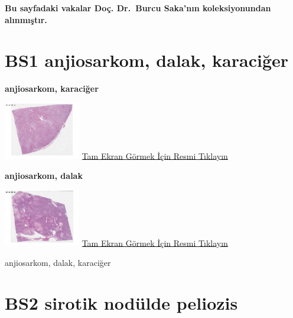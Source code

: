 \documentclass[
  letterpaper,
  DIV=11,
  numbers=noendperiod]{scrreprt}
\begin{document}
\textbf{Bu sayfadaki vakalar Doç. Dr.~Burcu Saka'nın koleksiyonundan
alınmıştır.}

\hypertarget{sec-BS1}{%
\section{BS1 anjiosarkom, dalak, karaciğer}\label{sec-BS1}}

\textbf{anjiosarkom, karaciğer}

\href{https://images.patolojiatlasi.com/BS1/HE1.html}{\includegraphics[width=0.25\textwidth,height=\textheight]{./screenshots/thumbnail_BS1-HE1.png}}
\href{https://images.patolojiatlasi.com/BS1/HE1.html}{Tam Ekran Görmek
İçin Resmi Tıklayın}

\textbf{anjiosarkom, dalak}

\href{https://images.patolojiatlasi.com/BS1/HE2.html}{\includegraphics[width=0.25\textwidth,height=\textheight]{./screenshots/thumbnail_BS1-HE2.png}}
\href{https://images.patolojiatlasi.com/BS1/HE2.html}{Tam Ekran Görmek
İçin Resmi Tıklayın}

\begin{tcolorbox}[enhanced jigsaw, colbacktitle=quarto-callout-tip-color!10!white, colback=white, titlerule=0mm, opacityback=0, colframe=quarto-callout-tip-color-frame, opacitybacktitle=0.6, bottomrule=.15mm, breakable, coltitle=black, title=\textcolor{quarto-callout-tip-color}{\faLightbulb}\hspace{0.5em}{Tanı}, toprule=.15mm, toptitle=1mm, bottomtitle=1mm, arc=.35mm, rightrule=.15mm, leftrule=.75mm, left=2mm]

anjiosarkom, dalak, karaciğer

\end{tcolorbox}

\hypertarget{sec-BS2}{%
\section{BS2 sirotik nodülde peliozis}\label{sec-BS2}}
\end{document}
